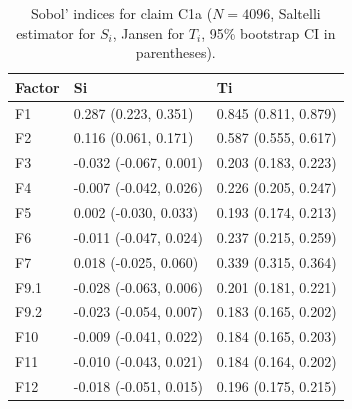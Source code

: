 \begin{table}[ht]
\centering
\caption{Sobol' indices for claim C1a ($N=4096$, Saltelli estimator for $S_i$, Jansen for $T_i$, 95\% bootstrap CI in parentheses).} 
\label{tab:sobol_C1a}
\begin{tabular}{lll}
  \hline
Factor & Si & Ti \\ 
  \hline
F1 & 0.287 (0.223, 0.351) & 0.845 (0.811, 0.879) \\ 
  F2 & 0.116 (0.061, 0.171) & 0.587 (0.555, 0.617) \\ 
  F3 & -0.032 (-0.067, 0.001) & 0.203 (0.183, 0.223) \\ 
  F4 & -0.007 (-0.042, 0.026) & 0.226 (0.205, 0.247) \\ 
  F5 & 0.002 (-0.030, 0.033) & 0.193 (0.174, 0.213) \\ 
  F6 & -0.011 (-0.047, 0.024) & 0.237 (0.215, 0.259) \\ 
  F7 & 0.018 (-0.025, 0.060) & 0.339 (0.315, 0.364) \\ 
  F9.1 & -0.028 (-0.063, 0.006) & 0.201 (0.181, 0.221) \\ 
  F9.2 & -0.023 (-0.054, 0.007) & 0.183 (0.165, 0.202) \\ 
  F10 & -0.009 (-0.041, 0.022) & 0.184 (0.165, 0.203) \\ 
  F11 & -0.010 (-0.043, 0.021) & 0.184 (0.164, 0.202) \\ 
  F12 & -0.018 (-0.051, 0.015) & 0.196 (0.175, 0.215) \\ 
   \hline
\end{tabular}
\end{table}
